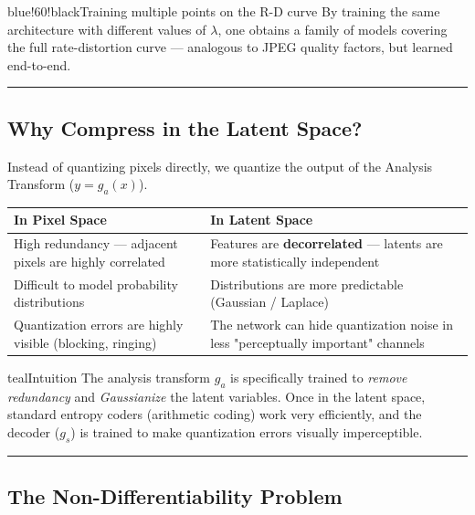 \begin{calloutbox}{blue!60!black}{Training multiple points on the R-D curve}
By training the same architecture with different values of $\lambda$, one obtains a family of models covering the full rate-distortion curve — analogous to JPEG quality factors, but learned end-to-end.
\end{calloutbox}

\bigskip\hrule\bigskip

\subsection{Why Compress in the Latent Space?}

Instead of quantizing pixels directly, we quantize the output of the Analysis Transform ($y = g_a(x)$).

\begin{center}
\begin{tabular}{|l|l|}
\hline
\textbf{In Pixel Space} & \textbf{In Latent Space} \\ \hline
High redundancy — adjacent pixels are highly correlated & Features are \textbf{decorrelated} — latents are more statistically independent \\ \hline
Difficult to model probability distributions & Distributions are more predictable (Gaussian / Laplace) \\ \hline
Quantization errors are highly visible (blocking, ringing) & The network can hide quantization noise in less "perceptually important" channels \\ \hline
\end{tabular}
\end{center}

\begin{calloutbox}{teal}{Intuition}
The analysis transform $g_a$ is specifically trained to \textit{remove redundancy} and \textit{Gaussianize} the latent variables. Once in the latent space, standard entropy coders (arithmetic coding) work very efficiently, and the decoder ($g_s$) is trained to make quantization errors visually imperceptible.
\end{calloutbox}

\bigskip\hrule\bigskip

\subsection{The Non-Differentiability Problem}

